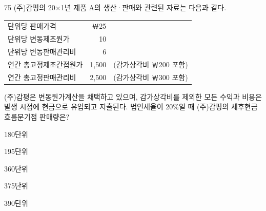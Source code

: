 \begin{question}{75}
(주)감평의 20×1년 제품 A의 생산·판매와 관련된 자료는 다음과 같다.
\begin{framedtext}
{\small\begin{tabular}{@{}lrl@{}}
단위당 판매가격 & ￦25 & \\
단위당 변동제조원가 & 10 & \\
단위당 변동판매관리비 & 6 & \\
연간 총고정제조간접원가 & 1,500 & (감가상각비 ￦200 포함) \\
연간 총고정판매관리비 & 2,500 & (감가상각비 ￦300 포함) \\
\end{tabular}\par}
\end{framedtext}
(주)감평은 변동원가계산을 채택하고 있으며, 감가상각비를 제외한 모든 수익과 비용은 발생 시점에 현금으로 유입되고 지출된다. 법인세율이 20\%일 때 (주)감평의 세후현금흐름분기점 판매량은?
\begin{choices}
  \item 180단위
  \item 195단위
  \item 360단위
  \item 375단위
  \item 390단위
\end{choices}
\end{question}
